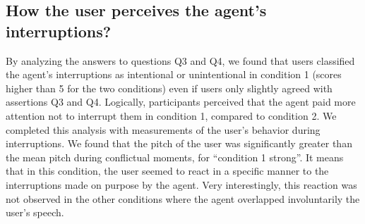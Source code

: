 \begin{table}
\centering
{}
\caption{Mean agreements of the participants for conditions 1 and condition 2 (translated from French).}
\label{Answers}
\end{table}

\subsection{How the user perceives the agent's interruptions?}

By analyzing the answers to questions Q3 and Q4, we found that users classified the agent's interruptions as intentional or unintentional in condition 1 (scores higher than 5 for the two conditions) even if users only slightly agreed with assertions Q3 and Q4. Logically, participants perceived that the agent paid more attention not to interrupt them in condition 1, compared to condition 2. 
We completed this analysis with measurements of the user's behavior during interruptions. We found that the pitch of the user was significantly greater than the mean pitch during conflictual moments, for ``condition 1 strong''. It means that in this condition, the user seemed to react in a specific manner to the interruptions made on purpose by the agent. Very interestingly, this reaction was not observed in the other conditions where the agent overlapped involuntarily the user's speech.


